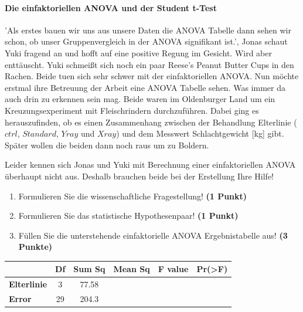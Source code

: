 \documentclass[a4paper, 9pt]{scrartcl}\usepackage[]{graphicx}\usepackage[]{xcolor}
\begin{document}
\ifcollection
\paragraph{Die einfaktoriellen ANOVA und der Student t-Test}
\fi

'Als erstes bauen wir uns aus unsere Daten die ANOVA Tabelle dann sehen wir schon, ob unser Gruppenvergleich in der ANOVA signifikant ist.', Jonas schaut Yuki fragend an und hofft auf eine positive Regung im Gesicht. Wird aber enttäuscht. Yuki schmeißt sich noch ein paar Reese's Peanut Butter Cups in den Rachen. Beide tuen sich sehr schwer mit der einfaktoriellen ANOVA. Nun möchte erstmal ihre Betreuung der Arbeit eine ANOVA Tabelle sehen. Was immer da auch drin zu erkennen sein mag. Beide waren im Oldenburger Land um ein Kreuzungsexperiment mit Fleischrindern durchzuführen. Dabei ging es herauszufinden, ob es einen Zusammenhang zwischen der Behandlung Elterlinie ($ctrl$, $Standard$, $Yray$ und $Xray$) und dem Messwert Schlachtgewicht [kg] gibt. Später wollen die beiden dann noch raus um zu Boldern.



\vspace{1ex}

Leider kennen sich Jonas und Yuki mit Berechnung einer einfaktoriellen ANOVA überhaupt nicht aus. Deshalb brauchen beide bei der Erstellung Ihre Hilfe! 

\begin{enumerate}
  \item Formulieren Sie die wissenschaftliche Fragestellung! \textbf{(1 Punkt)}
  \item Formulieren Sie das statistische Hypothesenpaar! \textbf{(1 Punkt)}
\item Füllen Sie die unterstehende einfaktorielle ANOVA Ergebnistabelle aus! \textbf{(3 Punkte)}
\end{enumerate}

\vspace{1Ex}

\begin{center}
  \Large
  \begin{tabular}{lccccp{3cm}}
\toprule
     & \textbf{Df} & \textbf{Sum Sq} & \textbf{Mean Sq} & \textbf{F value} & \textbf{Pr(>F)} \strut\\
    \midrule
   \textbf{Elterlinie}  & 3 & 77.58 &  &  &  \strut\\
   \textbf{Error}  & 29 & 204.3 &  &  &  \strut\\
\bottomrule
  \end{tabular}
\end{center}
\end{document}
